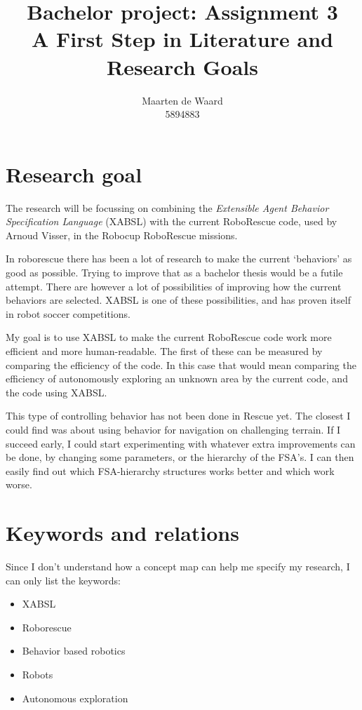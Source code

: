 \documentclass[a4paper,10pt]{article}
\title{Bachelor project: Assignment 3\\\vspace{.2cm}\large A First Step in Literature and
Research Goals}
\author{Maarten de Waard\\\small 5894883}
\begin{document}
\maketitle
\section{Research goal}
The research will be focussing on combining the \textit{Extensible Agent
Behavior Specification Language} (XABSL) with the current RoboRescue code, used
by Arnoud Visser, in the Robocup RoboRescue missions. 

In roborescue there has been a lot of research to make the current `behaviors'
as good as possible. Trying to improve that as a bachelor thesis would be a
futile attempt. There are however a lot of possibilities of improving how the
current behaviors are selected. XABSL is one of these possibilities, and has
proven itself in robot soccer competitions. \cite{lotzsch2004designing} \cite{loetzsch2006xabsl}

My goal is to use XABSL to make the current RoboRescue code work more efficient
and more human-readable. The first of these can be measured by comparing the
efficiency of the code. In this case that would mean comparing the efficiency of
autonomously 
exploring an unknown area by the current code, and the code using XABSL.

This type of controlling behavior has not been done in Rescue yet. The closest I
could find was about using behavior for navigation on challenging terrain.
\cite{seraji2002behavior} If I succeed early, I could start experimenting with
whatever extra improvements can be done, by changing some parameters, or the
hierarchy of the FSA's. I can then easily find out which FSA-hierarchy
structures
works better and which work worse. 

\section{Keywords and relations}
Since I don't understand how a concept map can help me specify my research, I
can only list the keywords:
\begin{itemize}
    \item XABSL
    \item Roborescue
    \item Behavior based robotics
    \item Robots
    \item Autonomous exploration
\end{itemize}
\end{document}
